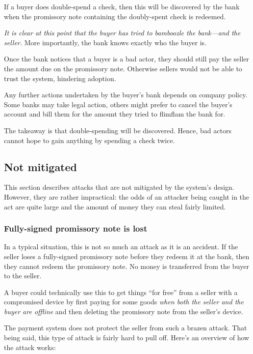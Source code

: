 \documentclass[12pt,a4paper]{article}
\begin{document}
\begin{multicols}{2}
	If a buyer does double-spend a check, then this will be discovered by the bank when the promissory note containing the doubly-spent check is redeemed.

	\emph{It is clear at this point that the buyer has tried to bamboozle the bank---and the seller.} More importantly, the bank knows exactly who the buyer is.

	Once the bank notices that a buyer is a bad actor, they should still pay the seller the amount due on the promissory note. Otherwise sellers would not be able to trust the system, hindering adoption.
	
	Any further actions undertaken by the buyer's bank depends on company policy. Some banks may take legal action, others might prefer to cancel the buyer's account and bill them for the amount they tried to flimflam the bank for.

	The takeaway is that double-spending will be discovered. Hence, bad actors cannot hope to gain anything by spending a check twice.

	\subsection{Not mitigated}
	
	This section describes attacks that are not mitigated by the system's design. However, they are rather impractical: the odds of an attacker being caught in the act are quite large and the amount of money they can steal fairly limited.

	\subsubsection{Fully-signed promissory note is lost}
	\label{sec:signed-promissory-note-is-lost}

	In a typical situation, this is not so much an attack as it is an accident. If the seller loses a fully-signed promissory note before they redeem it at the bank, then they cannot redeem the promissory note. No money is transferred from the buyer to the seller.

	A buyer could technically use this to get things ``for free'' from a seller with a compromised device by first paying for some goods \emph{when both the seller and the buyer are offline} and then deleting the promissory note from the seller's device.

	The payment system does not protect the seller from such a brazen attack. That being said, this type of attack is fairly hard to pull off. Here's an overview of how the attack works:


\end{multicols}
\end{document}
